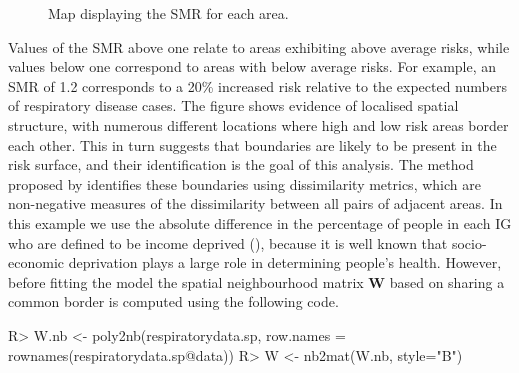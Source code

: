 \documentclass[article,shortnames,nojss]{jss}
\begin{document}
    
\begin{figure}
\centering 
{}
\caption{Map displaying the SMR for each area.\label{smrmap}}
\end{figure} 


Values of the SMR above one relate to areas exhibiting above average risks, while values below one correspond to areas with below average risks. For example, an SMR of 1.2 corresponds to a 20\% increased risk relative to the expected numbers of respiratory disease cases. The figure shows evidence of localised spatial structure, with numerous different locations where high and low risk areas border each other. This in turn suggests that boundaries are likely to be present in the risk surface, and their identification is the goal of this analysis. The method proposed by \cite{lee2012} identifies these boundaries using dissimilarity metrics, which are non-negative measures of the dissimilarity between all pairs of adjacent areas. In this example we use the absolute difference in the percentage of people in each IG who are defined to be income deprived (), because it is well known that socio-economic deprivation plays a large role in determining people's health. However, before fitting the model the spatial neighbourhood matrix $\mathbf{W}$ based on sharing a common border is computed using the following code.



\begin{Schunk}
\begin{Sinput}
R> W.nb <- poly2nb(respiratorydata.sp, row.names = rownames(respiratorydata.sp@data))
R> W <- nb2mat(W.nb, style="B")
\end{Sinput}
\end{Schunk}
\end{document}
